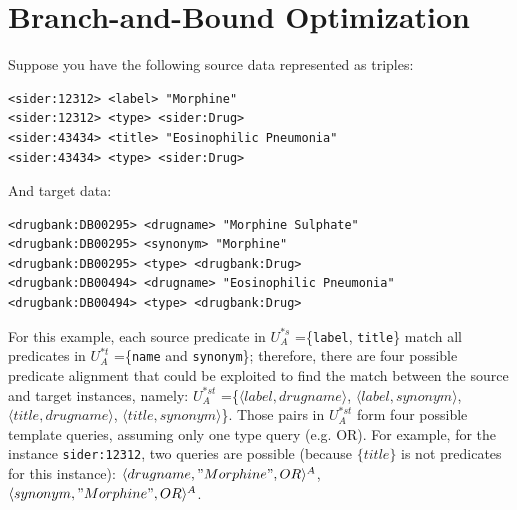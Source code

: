 \section{Branch-and-Bound Optimization}


Suppose you have the following source data represented as triples:
\begin{lstlisting}[basicstyle=\LSTfont]
<sider:12312> <label> "Morphine"
<sider:12312> <type> <sider:Drug>
<sider:43434> <title> "Eosinophilic Pneumonia"
<sider:43434> <type> <sider:Drug>
\end{lstlisting}
And target data: 
\begin{lstlisting}[basicstyle=\LSTfont]
<drugbank:DB00295> <drugname> "Morphine Sulphate"
<drugbank:DB00295> <synonym> "Morphine"
<drugbank:DB00295> <type> <drugbank:Drug>
<drugbank:DB00494> <drugname> "Eosinophilic Pneumonia"
<drugbank:DB00494> <type> <drugbank:Drug>
\end{lstlisting}

For this example, each source predicate in $U^{*s}_A$ =\{\verb+label+, \verb+title+\} match all predicates in $U^{*t}_A$ =\{\verb+name+ and \verb+synonym+\}; therefore, there are four possible predicate alignment that could be exploited to find the match between the source and target instances, namely: $U^{*st}_A$ =\{$\langle label,drugname \rangle$, $\langle label,synonym \rangle$,$\langle title,drugname \rangle$, $\langle title,synonym \rangle$\}. Those pairs in  $U^{*st}_A$ form four possible template queries, assuming  only one type query (e.g. OR). For example, for the instance \verb+sider:12312+, two queries are possible (because $\{ title\}$ is not predicates for this instance):
$\langle drugname,"Morphine", OR \rangle^A$, 
$\langle synonym,"Morphine", OR \rangle^A$.
 
